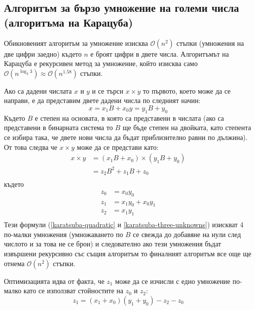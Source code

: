   \subsection{Алгоритъм за бързо умножение на големи числа (алгоритъма на Карацуба)} \label{karatsuba}
  Обикновеният алгоритъм за умножение изисква $\mathcal{O}(n^2)$ стъпки (умножения на две цифри заедно) където $n$ е броят цифри в двете числа. Алгоритъмът на Карацуба е рекурсивен метод за умножение, който изисква само $\mathcal{O}(n^{\log_2 3}) \approx \mathcal{O}(n^{1.58})$ стъпки.

  Ако са дадени числата $x$ и $y$ и се търси $x \times y$ то първото, което може да се направи, е да представим двете дадени числа по следният начин:
  \begin{equation}
    x = x_1 B + x_0
    y = y_1 B + y_0
    \label{karatsuba-breakability}
  \end{equation}
  Където $B$ е степен на основата, в която са представени в числата (ако са представени в бинарната система то $B$ ще бъде степен на двойката, като степента се избира така, че двете нови числа да бъдат приблизително равни по дължина). От това следва че $x \times y$ може да се представи като:
  \begin{equation}
    \begin{split}
      x \times y &= (x_1 B + x_0) \times (y_1 B + y_0) \\
                 &= z_2 B^2 + z_1 B + z_0 \\
    \end{split}
    \label{karatsuba-quadratic}
  \end{equation}
  където
  \begin{equation}
    \begin{split}
      z_0 &= x_0 y_0 \\
      z_1 &= x_1 y_0 + x_0 y_1 \\
      z_2 &= x_1 y_1 \\
    \end{split}
    \label{karatsuba-three-unknowns}
  \end{equation}
  Тези формули (\ref{karatsuba-quadratic} и \ref{karatsuba-three-unknowns}) изискват 4 по-малки умножения (умножаването по $B$ се свежда до добавяне на нули след числото и за това не се брои) и следователно ако тези умножения бъдат извършени рекурсивно със същия алгоритъм то финалният алгоритъм все още ще отнема $\mathcal{O}(n^2)$ стъпки.

  Оптимизацията идва от факта, че $z_1$ може да се изчисли с едно умножение по-малко като се използват стойностите на $z_0$ и $z_2$:
  \begin{equation}
    z_1 = (x_1 + x_0)(y_1 + y_0) - z_2 - z_0
    \label{karatsuba-trick}
  \end{equation}

